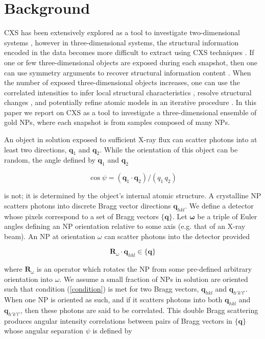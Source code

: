 \documentclass [12pt,fleqn]{article}
\def \be {\begin{equation}}
\def \ee {\end{equation}}
\begin{document}
\section{Background}
CXS has been extensively explored as a tool to investigate two-dimensional systems \cite{kurta2013xray, schroer2014characteristics, lehmkuhler2014detecting, kurta2012xray, pedrini2013two, saldin2011new}, however in three-dimensional systems, the structural information encoded in the data becomes more difficult to extract using  CXS techniques \cite{elser2011strategies}. If one or few three-dimensional objects are exposed during each snapshot, then one can use symmetry arguments to recover structural information content \cite{kam1980reconstruction, poon2015use, chen2012structure, liu2013three, starodub2012single, saldin2011reconstructing}. When the number of exposed three-dimensional objects increases, one can use the correlated intensities to infer local structural characteristics \cite{wochner2009x, altarelli2010x, kurta2013cross, malmerberg2015operational}, resolve structural changes \cite{pande2015simulations}, and potentially refine atomic models in an iterative procedure \cite{liu2012computation}. In this paper we report on CXS as a tool to investigate a three-dimensional ensemble of gold NPs, where each snapshot is from samples composed of many NPs.

An object in solution exposed to sufficient X-ray flux can scatter photons into at least two directions, $\bm q_1$ and $\bm q_2$. While the orientation of this object can be random, the angle defined by $\bm q_1$ and $\bm q_2$ 

\be \label{cpsi}
\cos \psi = (\bm q_1 \cdot \bm q_2)/(q_1 \, q_2 )
\ee

is not; it is determined by the object's internal atomic structure. A crystalline NP scatters photons into discrete  Bragg vector directions $\bm q_{hkl}$. We define a detector whose pixels correspond to a set of Bragg vectors $\{\bm q\}$. Let $\bm \omega$ be a triple of Euler angles defining an NP orientation relative to some axis (e.g. that of an X-ray beam). An NP at orientation $\omega$ can scatter photons into the detector provided

\be \label{condition}
\bm R_\omega \cdot \bm q_{hkl} \in \{\bm q\}
\ee

where $\bm R_\omega$ is an operator which rotates the NP from some pre-defined arbitrary orientation into $\omega$. We assume a small fraction of NPs in solution are oriented such that condition (\ref{condition}) is met for two Bragg vectors, $\bm q_{hkl}$ and $\bm q_{h'k'l'}$. When one NP is oriented as such, and if it scatters photons into both $\bm q_{hkl}$ and $\bm q_{h'k'l'}$, then these photons are said to be correlated. This double Bragg scattering produces angular intensity correlations between pairs of Bragg vectors in $\{\bm q\}$ whose angular separation $\psi$ is defined by
\end{document}
